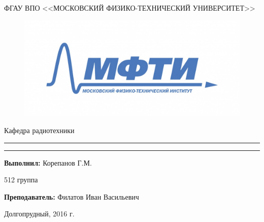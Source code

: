 \begin{titlepage}
\begin{center}\large
ФГАУ ВПО <<МОСКОВСКИЙ ФИЗИКО-ТЕХНИЧЕСКИЙ УНИВЕРСИТЕТ>>
\begin{figure}[H]
\centering
\includegraphics[width=15cm]{logo.jpg}
\end{figure}
{\Large
Кафедра радиотехники}

\vfill

\hrule
\vspace{0.3cm}

\huge \LabTitle

\vspace{0.3cm}
\hrule




\end{center}

\vfill


\begin{minipage}{0.7\textwidth}
\textbf{Выполнил:}
Корепанов Г.М.

512 группа

\vspace{0.5cm}

\textbf{Преподаватель:}
Филатов Иван Васильевич
\end{minipage}


\vfill
\centering
 Долгопрудный, 2016 г.




\end{titlepage}
